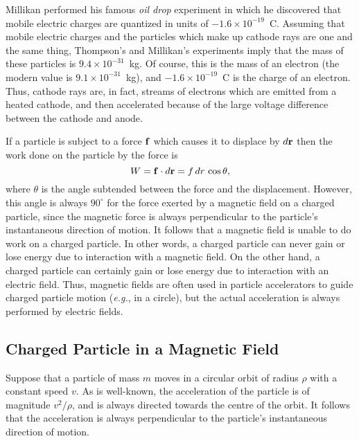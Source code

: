 Millikan performed his famous {\em oil drop} experiment in which he
 discovered that
mobile electric charges are quantized in units of $-1.6\times 10^{-19}$~C. 
Assuming that mobile electric charges and the particles which
make up cathode rays are one and the same thing,
 Thompson's and Millikan's experiments imply that the mass
of  these particles is  $9.4\times 10^{-31}$~kg. Of course, this is the mass of
an electron (the modern value is $9.1\times 10^{-31}$~kg), and  
$-1.6\times 10^{-19}$~C is the charge of an electron. Thus, cathode rays are, in fact,
streams of electrons which are  emitted from a heated cathode, and then
accelerated because of  the large voltage difference between the cathode and anode.

If a particle is subject to a force ${\bf f}$ which causes it
to displace by
$d{\bf r}$ then the work done on the particle by the
force is
\begin{equation}
W = {\bf f}\cdot d{\bf r} =
 f\,dr\,\cos\theta,
\end{equation}
where $\theta$ is the angle subtended between the force and the displacement. However, this angle is always $90^\circ$ for the force exerted by a magnetic field on
a charged particle, since the magnetic force is
always perpendicular to the particle's instantaneous direction of motion.
 It follows that
a magnetic field is unable to do work on a charged particle. 
 In other words, a
charged particle can never gain or lose energy due to interaction with
a magnetic field. On the other hand, a charged particle can certainly gain
or lose energy due to interaction with an electric field. 
Thus, magnetic
fields are often used in particle accelerators to guide charged particle motion ({\em e.g.}, in a circle), but the
actual acceleration is always performed by electric fields. 

\subsection{Charged Particle in a Magnetic Field}
Suppose that a particle of mass $m$ moves in a circular orbit of
radius $\rho$ with a constant speed $v$. As is well-known, the acceleration of the
particle is of magnitude $v^2/\rho$, and is always
directed towards the centre of the orbit. It follows that the
acceleration is always perpendicular to the particle's instantaneous
direction of motion. 

